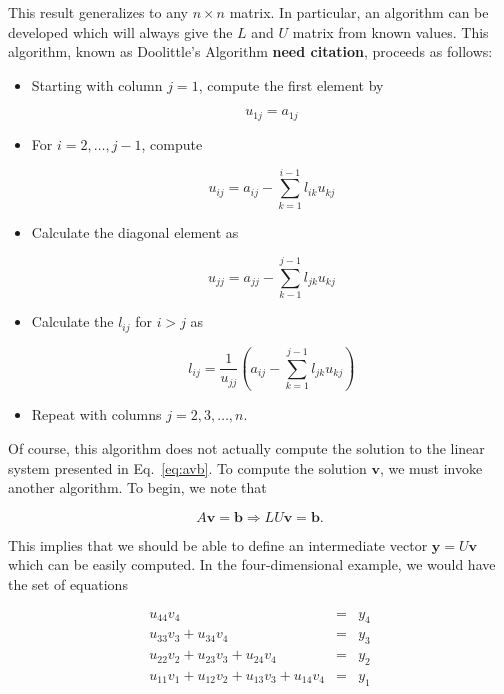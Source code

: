 \documentclass[12pt]{article}
\numberwithin{equation}{section}
\begin{document}
\noindent This result generalizes to any $n\times n$ matrix.  In particular, an algorithm can be developed which will always give the $L$ and $U$ matrix from known values.  This algorithm, known as Doolittle's Algorithm \textbf{need citation}, proceeds as follows:

\begin{itemize}
\item Starting with column $j=1$, compute the first element by 

\begin{equation}
u_{1j}=a_{1j}
\end{equation}

\item For $i=2,\ldots,j-1$, compute

\begin{equation}
u_{ij}=a_{ij}-\sum_{k=1}^{i-1}l_{ik}u_{kj}
\end{equation}

\item Calculate the diagonal element as

\begin{equation}
u_{jj}=a_{jj}-\sum_{k-1}^{j-1} l_{jk}u_{kj}
\end{equation}

\item Calculate the $l_{ij}$ for $i>j$ as

\begin{equation}
l_{ij}=\frac{1}{u_{jj}}\left(a_{ij}-\sum_{k=1}^{j-1} l_{jk}u_{kj}\right)
\end{equation}

\item Repeat with columns $j=2,3,\ldots,n$.
\end{itemize}

\noindent Of course, this algorithm does not actually compute the solution to the linear system presented in Eq.~\ref{eq:avb}.  To compute the solution $\textbf{v}$, we must invoke another algorithm.  To begin, we note that

\begin{equation}
\label{eq:axbluxb}
A\textbf{v}=\textbf{b}\Rightarrow LU\textbf{v}=\textbf{b}.
\end{equation}

\noindent This implies that we should be able to define an intermediate vector $\textbf{y}=U\textbf{v}$ which can be easily computed.  In the four-dimensional example, we would have the set of equations

$$\begin{array}{rcc} u_{44}v_{4}&=&y_{4} \\
u_{33}v_{3}+u_{34}v_{4}&=&y_{3} \\
u_{22}v_{2}+u_{23}v_{3}+u_{24}v_{4}&=&y_{2} \\
u_{11}v_{1}+u_{12}v_{2}+u_{13}v_{3}+u_{14}v_{4}&=& y_{1} \end{array}$$
\end{document}
